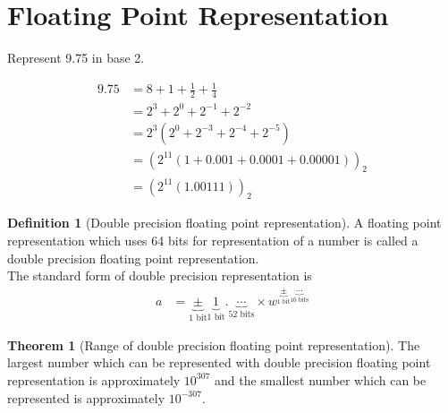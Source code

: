 \documentclass[fleqn, a4paper, 12pt, twoside, titlepage]{article}
\theoremstyle{definition}
\newtheorem{definition}{Definition}
\theoremstyle{theorem}
\newtheorem{theorem}{Theorem}
\begin{document}
\section{Floating Point Representation}

\begin{question}
	Represent 9.75 in base 2.
\end{question}

\begin{solution}
	\begin{align*}
		9.75 & = 8 + 1 + \frac{1}{2} + \frac{1}{4}                                   \\
                     & = 2^3 + 2^0 + 2^{-1} + 2^{-2}                                         \\
                     & = 2^3 \left( 2^0 + 2^{-3} + 2^{-4} + 2^{-5} \right)                   \\
                     & = \left( 2^{11} \left( 1 + 0.001 + 0.0001 + 0.00001 \right) \right)_2 \\
                     & = \left( 2^{11} \left( 1.00111 \right) \right)_2
	\end{align*}
\end{solution}

\begin{definition}[Double precision floating point representation]
	A floating point representation which uses 64 bits for representation of a number is called a double precision floating point representation.\\
	The standard form of double precision representation is
	\begin{align*}
		a & = \underbrace{\pm}_{\text{1 bit}} \underbrace{1}_{\text{1 bit}}.\underbrace{\cdots}_{\text{52 bits}} \times w^{\underbrace{\pm}_{\text{1 bit}} \underbrace{\cdots}_{\text{10 bits}}}
	\end{align*}
\end{definition}

\begin{theorem}[Range of double precision floating point representation]
	The largest number which can be represented with double precision floating point representation is approximately $10^{307}$ and the smallest number which can be represented is approximately $10^{-307}$.
	\label{Range_of_double_precision_floating_point_representation}
\end{theorem}
\end{document}
